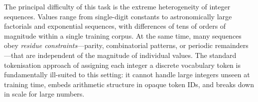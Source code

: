 The principal difficulty of this task is the extreme heterogeneity of integer sequences.
Values range from single-digit constants to astronomically large factorials and exponential
sequences, with differences of tens of orders of magnitude within a single training corpus.
At the same time, many sequences obey \emph{residue constraints}---parity, combinatorial
patterns, or periodic remainders---that are independent of the magnitude of individual values.
The standard tokenisation approach of assigning each integer a discrete vocabulary token is
fundamentally ill-suited to this setting: it cannot handle large integers unseen at training
time, embeds arithmetic structure in opaque token IDs, and breaks down in scale for large numbers.

